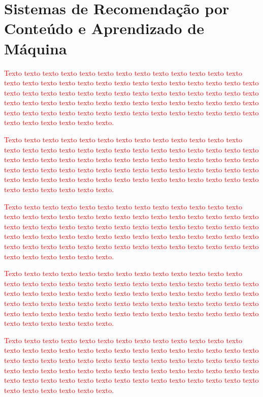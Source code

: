 \documentclass[normaltoc, espacoumemeio, pnumromarab,ruledheader]{abnt}
\begin{document}
\chapter{Sistemas de Recomendação por Conteúdo e Aprendizado de Máquina}

\textcolor{red}{Texto texto texto texto texto texto texto texto texto texto texto texto texto texto texto texto texto texto texto texto texto texto texto texto texto texto texto texto texto texto texto texto texto texto texto texto texto texto texto texto texto texto texto texto texto texto texto texto texto texto texto texto texto texto texto texto texto texto texto texto texto texto texto texto texto texto texto texto texto texto texto texto texto texto texto.}

\textcolor{red}{Texto texto texto texto texto texto texto texto texto texto texto texto texto texto texto texto texto texto texto texto texto texto texto texto texto texto texto texto texto texto texto texto texto texto texto texto texto texto texto texto texto texto texto texto texto texto texto texto texto texto texto texto texto texto texto texto texto texto texto texto texto texto texto texto texto texto texto texto texto texto texto texto texto texto texto.}

\textcolor{red}{Texto texto texto texto texto texto texto texto texto texto texto texto texto texto texto texto texto texto texto texto texto texto texto texto texto texto texto texto texto texto texto texto texto texto texto texto texto texto texto texto texto texto texto texto texto texto texto texto texto texto texto texto texto texto texto texto texto texto texto texto texto texto texto texto texto texto texto texto texto texto texto texto texto texto texto.}

\textcolor{red}{Texto texto texto texto texto texto texto texto texto texto texto texto texto texto texto texto texto texto texto texto texto texto texto texto texto texto texto texto texto texto texto texto texto texto texto texto texto texto texto texto texto texto texto texto texto texto texto texto texto texto texto texto texto texto texto texto texto texto texto texto texto texto texto texto texto texto texto texto texto texto texto texto texto texto texto.}

\textcolor{red}{Texto texto texto texto texto texto texto texto texto texto texto texto texto texto texto texto texto texto texto texto texto texto texto texto texto texto texto texto texto texto texto texto texto texto texto texto texto texto texto texto texto texto texto texto texto texto texto texto texto texto texto texto texto texto texto texto texto texto texto texto texto texto texto texto texto texto texto texto texto texto texto texto texto texto texto.}
\end{document}
